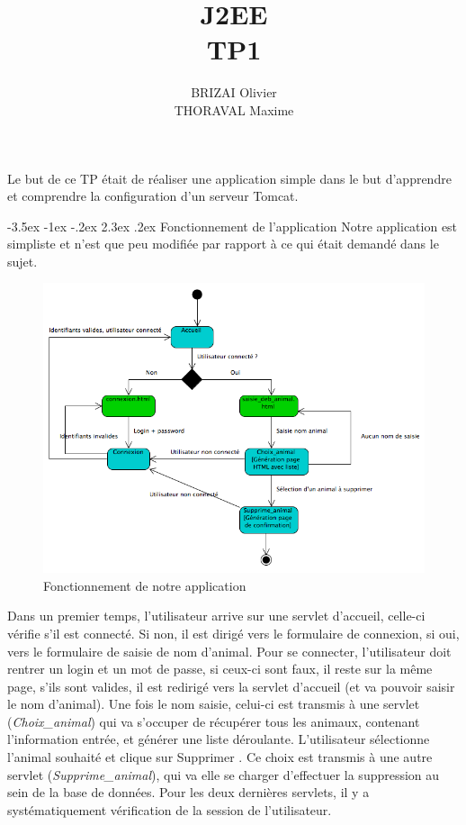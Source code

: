 \documentclass[a4paper,12pt]{article}
\makeatletter
\renewcommand\section{\@startsection {section}{1}{\z@}%
                           {-3.5ex \@plus -1ex \@minus -.2ex}%
                           {2.3ex \@plus.2ex}%
                           {\normalfont\Large\bfseries}}
\makeatother
\begin{document}
\newpage
\title{J2EE\\TP1}
\date{}
\author{BRIZAI Olivier\\THORAVAL Maxime}
\maketitle

\newpage
Le but de ce TP était de réaliser une application simple dans le but d'apprendre et comprendre la configuration d'un serveur Tomcat.

\section{Fonctionnement de l'application}
Notre application est simpliste et n'est que peu modifiée par rapport à ce qui était demandé dans le sujet.

\begin{figure}[H]
	\center
	\includegraphics[width=15cm]{diag.png}
	\caption{Fonctionnement de notre application}
\end{figure}

Dans un premier temps, l'utilisateur arrive sur une servlet d'accueil, celle-ci vérifie s'il est connecté. Si non, il est dirigé vers le formulaire de connexion, si oui, vers le formulaire de saisie de nom d'animal. Pour se connecter, l'utilisateur doit rentrer un login et un mot de passe, si ceux-ci sont faux, il reste sur la même page, s'ils sont valides, il est redirigé vers la servlet d'accueil (et va pouvoir saisir le nom d'animal). Une fois le nom saisie, celui-ci est transmis à une servlet (\textit{Choix\_animal}) qui va s'occuper de récupérer tous les animaux, contenant l'information entrée, et générer une liste déroulante. L'utilisateur sélectionne l'animal souhaité et clique sur \og Supprimer \fg. Ce choix est transmis à une autre servlet (\textit{Supprime\_animal}), qui va elle se charger d'effectuer la suppression au sein de la base de données. Pour les deux dernières servlets, il y a systématiquement vérification de la session de l'utilisateur.
\end{document}
